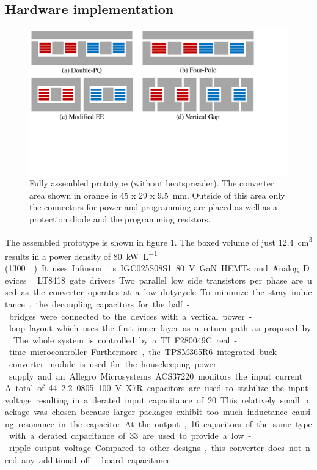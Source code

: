 \documentclass{IPEC2026}
\begin{document}
\subsection{Hardware implementation}
\begin{figure}
  \centering
  \includegraphics[page=4, trim = 0cm 0cm 3cm 0cm, clip, width=\columnwidth]{figures/IPEC_Figures_PowerPoint.pdf}
  \caption{Fully assembled prototype (without heatspreader).  The converter area shown in orange is 45 x 29 x \qty{9.5}{\mm}. Outside of this area only the connectors for power and programming are placed as well as a protection diode and the programming resistors.}
  \label{fig:PrototypePicture}
\end{figure}
The assembled prototype is shown in figure \ref{fig:PrototypePicture}. The boxed volume of just \qty{12.4}{\cubic\cm} results in a power density of \qty{80}{\kW\per\liter} (\qty{1300}{\W\per\cubic\inch}) 
It uses Infineon's IGC025S08S1 \qty{80}{\V} GaN HEMTs and Analog Devices' LT8418 gate drivers. Two parallel low side transistors per phase are used as the converter operates at a low dutycycle. To minimize the stray inductance, the decoupling capacitors for the half-bridges were connected to the devices with a vertical power-loop layout which uses the first inner layer as a return path as proposed by \cite{reuschUnderstandingEffectPCB2014}.
The whole system is controlled by a TI F280049C real-time microcontroller. Furthermore, the TPSM365R6 integrated buck-converter module is used for the housekeeping power-supply and an Allegro Microsystems ACS37220 monitors the input current.
A total of 44 \qty{2.2}{\uF} 0805 \qty{100}{\V} X7R capacitors are used to stabilize the input voltage resulting in a derated input capacitance of \qty{20}{\uF}. This relatively small package was chosen because larger packages exhibit too much inductance causing resonance in the capacitor. At the output, 16 capacitors of the same type with a derated capacitance of \qty{33}{\uF} are used to provide a low-ripple output voltage. Compared to other designs, this converter does not need any additional off-board capacitance.
\end{document}
